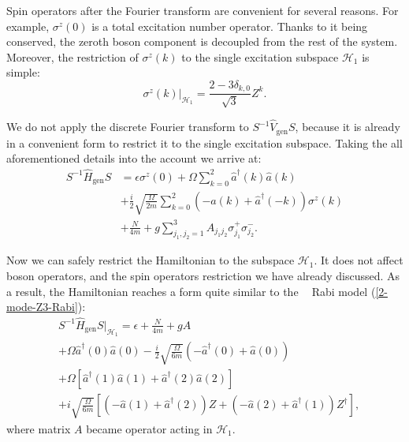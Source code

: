 \documentclass[reprint, aps, prx, amsmath, amssymb, longbibliography, superscriptaddress]{revtex4-2}
\DeclareMathOperator{\Zthree}{\mathbb{Z}_3}
\begin{document}
Spin operators after the Fourier transform are convenient for several reasons. For example, $\sigma^z(0) $ is a total excitation number operator. Thanks to it being conserved, the zeroth boson component is decoupled from the rest of the system. Moreover, the restriction of $\sigma^z(k)$ to the single excitation subspace $\mathcal{H}_1$ is simple:
\begin{equation}
    \sigma^z(k) \bigg|_{\mathcal{H}_1} = \frac{2 - 3 \delta_{k,0}}{\sqrt{3}} Z^k.
\end{equation}

We do not apply the discrete Fourier transform to $S^{-1} \hat V_{\text{gen}}S $, because it is already in a convenient form to restrict it to the single excitation subspace. Taking the all aforementioned details into the account we arrive at:
\begin{equation}
\begin{aligned}
    S^{-1} \hat H_{\text{gen}} S &= \epsilon \sigma^z(0) + \Omega \sum\limits_{k=0}^{2} \hat a^{\dagger}(k) \hat a(k) \\
    &+ \frac{i}{2}\sqrt{\frac{\Omega}{2 m}} \sum\limits_{k = 0}^{2} (-\hat a(k) + \hat a^{\dagger}(-k)) \sigma^z(k) \\
    &+ \frac{N}{4m} + g \sum\limits_{j_1,j_2=1}^3 A_{j_1 j_2} \sigma_{j_1}^+ \sigma_{j_2}^-.
\end{aligned}
\end{equation}

Now we can safely restrict the Hamiltonian to the subspace $\mathcal{H}_1$. It does not affect boson operators, and the spin operators restriction we have already discussed. As a result, the Hamiltonian reaches a form quite similar to the $\Zthree$ Rabi model (\ref{2-mode-Z3-Rabi}):
\begin{equation}
\begin{aligned}
    &S^{-1} \hat H_{\text{gen}} S\bigg  |_{\mathcal{H}_1} = \epsilon + \frac{N}{4m} + g A \\
    &+\Omega \hat a^{\dagger}(0) \hat a(0) - \frac{i}{2}\sqrt{\frac{\Omega}{6 m}}\left(-\hat a^{\dagger}(0) + \hat a(0)\right) \\
    &+\Omega \left[\hat a^{\dagger}(1) \hat a(1) + \hat a^{\dagger}(2) \hat a(2)\right] \\ 
    &+ i\sqrt{\frac{\Omega}{6 m}} \left[(-\hat a(1) + \hat a^{\dagger}(2))Z  + (-\hat a(2) + \hat a^{\dagger}(1))Z^{\dagger}  \right] ,
\end{aligned}
\end{equation}
where matrix $A$ became operator acting in $\mathcal{H}_1$. 
\end{document}
